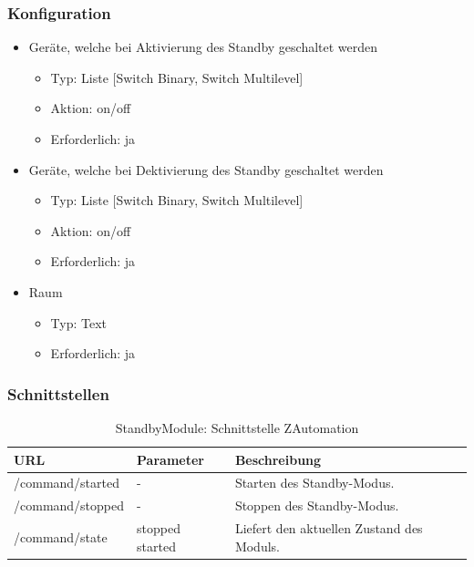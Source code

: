 \subsubsection{Konfiguration}
\begin{itemize}
	\item Geräte, welche bei Aktivierung des Standby geschaltet werden
	\begin{itemize}
		\item 	Typ: Liste [Switch Binary, Switch Multilevel]
		\item Aktion: on/off 
		\item Erforderlich: ja
	\end{itemize}
	\item Geräte, welche bei Dektivierung des Standby geschaltet werden
	\begin{itemize}
		\item 	Typ: Liste [Switch Binary, Switch Multilevel]
		\item Aktion: on/off 
		\item Erforderlich: ja
	\end{itemize}
	\item Raum
	\begin{itemize}
		\item Typ: Text
		\item Erforderlich: ja
	\end{itemize}
\end{itemize}

\subsubsection{Schnittstellen}
\begin{table}[H]
	\begin{tabularx}{\textwidth}{
			>{\hsize=1.25\hsize}X %
			>{\hsize=0.5\hsize\centering}X %
			>{\hsize=1.25\hsize}X %
		}
		\hline
		\textbf{URL}						& \textbf{Parameter}	& \textbf{Beschreibung} \\
		\hline /command/started				& - 					& Starten des Standby-Modus. \\ 
		\hline /command/stopped				& - 			 		& Stoppen des Standby-Modus. \\
		\hline /command/state				& stopped started	& Liefert den aktuellen Zustand des Moduls. \\
		\hline
	\end{tabularx}
	\caption{StandbyModule: Schnittstelle ZAutomation}
\end{table}

